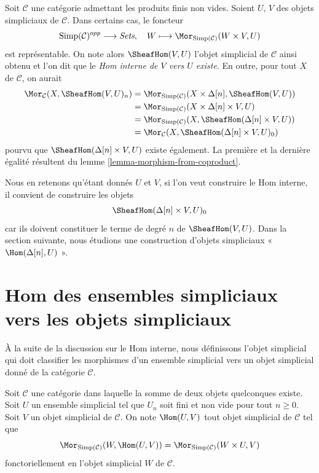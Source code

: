 \noindent
Soit $\mathcal{C}$ une catégorie admettant les produits finis non vides.
Soient $U$, $V$ des objets simpliciaux de $\mathcal{C}$. Dans certains
cas, le foncteur
$$
\text{Simp}(\mathcal{C})^{opp} \longrightarrow \textit{Sets}, \quad
W \longmapsto \Mor_{\text{Simp}(\mathcal{C})}(W \times V, U)
$$
est représentable. On note alors $\SheafHom(V, U)$ l'objet simplicial
de $\mathcal{C}$ ainsi obtenu et l'on dit que le
{\it Hom interne de $V$ vers $U$ existe}. En outre, pour tout $X$ de
$\mathcal{C}$, on aurait
\begin{align*}
\Mor_\mathcal{C}(X, \SheafHom(V, U)_n)
& =
\Mor_{\text{Simp}(\mathcal{C})}(X \times \Delta[n], \SheafHom(V, U)) \\
& =
\Mor_{\text{Simp}(\mathcal{C})}(X \times \Delta[n]\times V, U) \\
& =
\Mor_{\text{Simp}(\mathcal{C})}(X, \SheafHom(\Delta[n] \times V, U)) \\
& =
\Mor_\mathcal{C}(X, \SheafHom(\Delta[n] \times V, U)_0)
\end{align*}
pourvu que $\SheafHom(\Delta[n] \times V, U)$ existe également.
La première et la dernière égalité résultent du lemme
\ref{lemma-morphism-from-coproduct}.

\medskip\noindent
Nous en retenons qu'étant donnés $U$ et $V$, si l'on veut construire le
Hom interne, il convient de construire les objets
$$
\SheafHom(\Delta[n] \times V, U)_0
$$
car ils doivent constituer le terme de degré $n$ de $\SheafHom(V, U)$.
Dans la section suivante, nous étudions une construction d'objets
simpliciaux « $\Hom(\Delta[n], U)$ ».
\section{Hom des ensembles simpliciaux vers les objets simpliciaux}
\label{section-hom-from-simplicial-sets}

\noindent
À la suite de la discussion sur le Hom interne, nous définissons l'objet
simplicial qui doit classifier les morphismes d'un ensemble simplicial
vers un objet simplicial donné de la catégorie $\mathcal{C}$.

\begin{definition}
\label{definition-hom-from-simplicial-set}
Soit $\mathcal{C}$ une catégorie dans laquelle la somme de deux objets
quelconques existe. Soit $U$ un ensemble simplicial tel que $U_n$ soit
fini et non vide pour tout $n \geq 0$. Soit $V$ un objet simplicial de
$\mathcal{C}$. On note {\it $\Hom(U, V)$} tout objet simplicial de
$\mathcal{C}$ tel que
$$
\Mor_{\text{Simp}(\mathcal{C})}(W, \Hom(U, V))
=
\Mor_{\text{Simp}(\mathcal{C})}(W \times U, V)
$$
fonctoriellement en l'objet simplicial $W$ de $\mathcal{C}$.
\end{definition}

